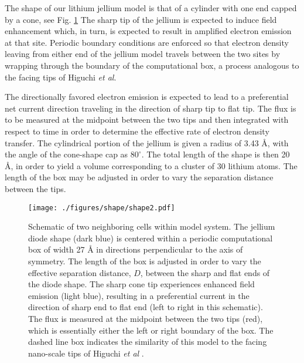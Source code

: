 \documentclass[%
 reprint,
 amsmath,amssymb,
pra,
tightenlines
]{revtex4-1}
\newcommand{\rev}[1]{{\color{red} #1}}
\begin{document}


The shape of our lithium jellium model is that of a cylinder with one end capped by a cone, see Fig. \ref{fig:shape} 
 The sharp tip of the jellium is expected to induce field enhancement\cite{PhysRevLett.86.540} which, in turn, is expected to result in amplified electron emission at that site. Periodic boundary conditions are enforced so that electron density leaving from either end of the jellium model travels between the two sites by wrapping through the boundary of the computational box, a process analogous to the facing tips of Higuchi \textit{et al}. 

The directionally favored electron emission is expected to lead to a preferential net current direction traveling in the direction of sharp tip to flat tip. The flux is to be measured at the midpoint between the two tips and then integrated with respect to time in order to determine the effective rate of electron density transfer. \rev{The cylindrical portion of the jellium is given a radius of 3.43 {\AA}, with the angle of the cone-shape cap as $80^{\circ}$. The total length of the shape is then 20 {\AA}, in order to yield a volume corresponding to a cluster of 30 lithium atoms.} The length of the box may be adjusted in order to vary the separation distance between the tips.   

\begin{figure}[ht]
	\texttt{[image: ./figures/shape/shape2.pdf]}
	\caption{Schematic of two neighboring cells within model system. The jellium diode shape (dark blue) is centered within a periodic computational box of width 27 {\AA} in directions perpendicular to the axis of symmetry. 
The length of the box is adjusted in order to vary the effective separation distance, $D$, between the sharp and flat ends of the diode shape. The sharp cone tip experiences enhanced field emission (light blue), resulting in a preferential current in the direction of sharp end to flat end (left to right in this schematic). The flux is measured at the midpoint between the two tips (red), which is essentially either the left or right boundary of the box. \rev{The dashed line box indicates the similarity of this model to the facing nano-scale tips of Higuchi \textit{et al} \cite{doi:10.1063/1.4907607}.} }
\label{fig:shape}
\end{figure} 
\end{document}
